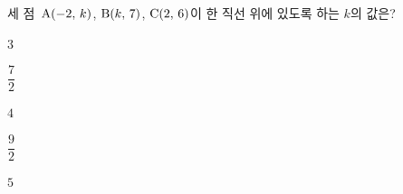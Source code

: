 세 점~$\mathrm{A}(-2,\mkern3mu k)$, $\mathrm{B}(k,\mkern3mu 7)$, $\mathrm{C}(2,\mkern3mu 6)$이 한 직선 위에 있도록 하는 $k$의 값은?
\begin{choices32}{\rule[-3ex]{0pt}{8ex}$3$}{\rule[-3ex]{0pt}{8ex}$\dfrac{7}{2}$}{\rule[-3ex]{0pt}{8ex}$4$}{\rule[-3ex]{0pt}{8ex}$\dfrac{9}{2}$}{\rule[-3ex]{0pt}{8ex}$5$}\end{choices32}
